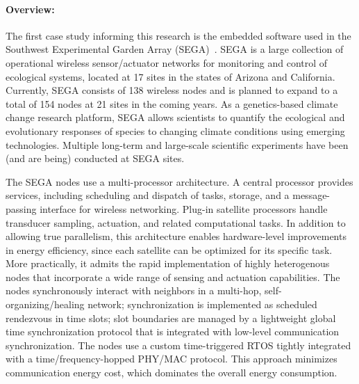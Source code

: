 
\paragraph{Overview:}

The first case study informing this research is the embedded software used in the Southwest Experimental Garden Array (SEGA)~\cite{ClaEtAl11,GhoEtAl2014,BelEtAl2015}.
SEGA is a large collection of operational wireless sensor/actuator networks for monitoring and control of ecological systems, located at 17 sites in the states of Arizona and California.
Currently, SEGA consists of 138 wireless nodes and is planned to expand to a total of 154 nodes at 21 sites in the coming years.
As a genetics-based climate change research platform, SEGA allows scientists to quantify the ecological and evolutionary responses of species to changing climate conditions using emerging technologies.
Multiple long-term and large-scale scientific experiments have been (and are being) conducted at SEGA sites.


The SEGA nodes use a multi-processor architecture.
A central processor provides services, including scheduling and dispatch of tasks, storage, and a message-passing interface for wireless networking.
Plug-in satellite processors handle transducer sampling, actuation, and related computational tasks.
In addition to allowing true parallelism, this architecture enables hardware-level improvements in energy efficiency, since each satellite can be optimized for its specific task.
More practically, it admits the rapid implementation of highly heterogenous nodes that incorporate a wide range of sensing and actuation capabilities.
%
The nodes synchronously interact with neighbors in a multi-hop, self-organizing/healing network; synchronization is implemented as scheduled rendezvous in time slots; slot boundaries are managed by a lightweight global time synchronization protocol that is integrated with low-level communication synchronization.
The nodes use a custom time-triggered RTOS tightly integrated with a time/frequency-hopped PHY/MAC protocol.
This approach %
minimizes communication energy cost, which dominates the overall energy consumption.

